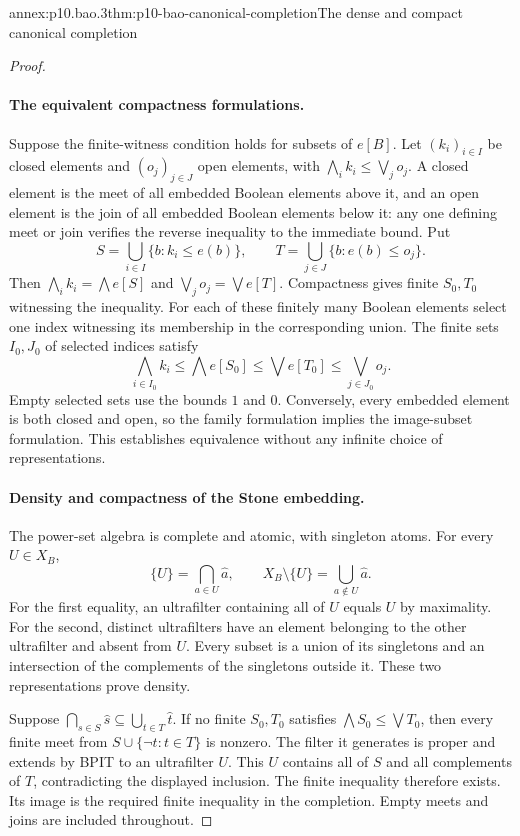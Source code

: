\begin{annexitem}{annex:p10.bao.3}{thm:p10-bao-canonical-completion}{The dense and compact canonical completion}
\begin{proof}
\paragraph{The equivalent compactness formulations.}
Suppose the finite-witness condition holds for subsets of \(e[B]\).
Let \((k_i)_{i\in I}\) be closed elements and
\((o_j)_{j\in J}\) open elements, with
\(\bigwedge_i k_i\leq\bigvee_j o_j\).
A closed element is the meet of all embedded Boolean elements
above it, and an open element is the join of all embedded Boolean
elements below it: any one defining meet or join verifies the
reverse inequality to the immediate bound.
Put
\[
 S=\bigcup_{i\in I}\{b:k_i\leq e(b)\},\qquad
 T=\bigcup_{j\in J}\{b:e(b)\leq o_j\}.
\]
Then \(\bigwedge_i k_i=\bigwedge e[S]\) and
\(\bigvee_j o_j=\bigvee e[T]\).
Compactness gives finite \(S_0,T_0\) witnessing the inequality.
For each of these finitely many Boolean elements select one
index witnessing its membership in the corresponding union.
The finite sets \(I_0,J_0\) of selected indices satisfy
\[
 \bigwedge_{i\in I_0} k_i
   \leq\bigwedge e[S_0]
   \leq\bigvee e[T_0]
   \leq\bigvee_{j\in J_0}o_j.
\]
Empty selected sets use the bounds \(1\) and \(0\).
Conversely, every embedded element is both closed and open, so
the family formulation implies the image-subset formulation.
This establishes equivalence without any infinite choice of
representations.

\paragraph{Density and compactness of the Stone embedding.}
The power-set algebra is complete and atomic, with singleton atoms.
For every \(U\in X_B\),
\[
 \{U\}=\bigcap_{a\in U}\widehat a,\qquad
 X_B\setminus\{U\}=\bigcup_{a\notin U}\widehat a.
\]
For the first equality, an ultrafilter containing all of \(U\)
equals \(U\) by maximality.
For the second, distinct ultrafilters have an element belonging
to the other ultrafilter and absent from \(U\).
Every subset is a union of its singletons and an intersection
of the complements of the singletons outside it.
These two representations prove density.

Suppose \(\bigcap_{s\in S}\widehat s
\subseteq\bigcup_{t\in T}\widehat t\).
If no finite \(S_0,T_0\) satisfies
\(\bigwedge S_0\leq\bigvee T_0\), then every finite meet from
\(S\cup\{\neg t:t\in T\}\) is nonzero.
The filter it generates is proper and extends by BPIT to an
ultrafilter \(U\).
This \(U\) contains all of \(S\) and all complements of \(T\),
contradicting the displayed inclusion.
The finite inequality therefore exists.
Its image is the required finite inequality in the completion.
Empty meets and joins are included throughout.


\end{proof}
\end{annexitem}

